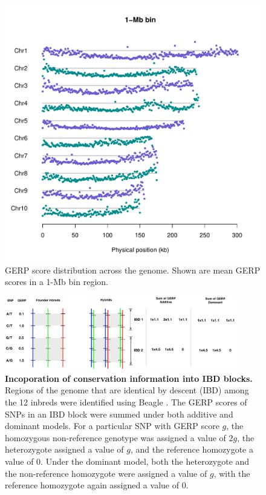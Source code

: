 \documentclass[9pt,twocolumn,twoside]{gsajnl}
\begin{document}
\begin{figure}[htbp]
\centering
\includegraphics[width=\linewidth]{SFig_gerp_dis1m.pdf}
\caption{GERP score distribution across the genome. Shown are mean GERP scores in a 1-Mb bin region.}
\label{fig:dis1m}
\end{figure}

\begin{figure}[h]
\includegraphics[width=0.9\textwidth]{SFig_gerpIBD.pdf}
\caption{
\textbf{Incoporation of conservation information into IBD blocks.}
Regions of the genome that are identical by descent (IBD) among the 12 inbreds were identified using Beagle \citep{Browning2009}.  The GERP scores of SNPs in an IBD block were summed under both additive and dominant models. For a particular SNP with GERP score $g$, the homozygous non-reference genotype was assigned a value of $2g$, the heterozygote assigned a value of $g$, and the reference homozygote a value of 0.  Under the dominant model, both the heterozygote and the non-reference homozygote were assigned a value of $g$, with the reference homozygote again assigned a value of 0.}
\label{fig:gerpibd}
\end{figure}
\end{document}
